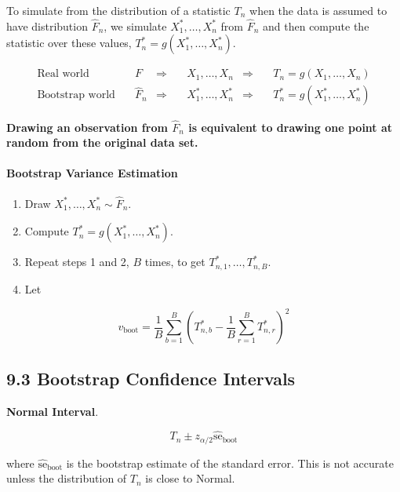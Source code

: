 To simulate from the distribution of a statistic \(T_{n}\) when the data
is assumed to have distribution \(\hat{F}_{n}\), we simulate
\(X_{1}^*, \dots, X_{n}^*\) from \(\hat{F}_{n}\) and then compute the
statistic over these values, \(T_{n}^* = g(X_{1}^*, \dots, X_{n}^*)\).

\begin{align*}
\text{Real world} \quad      & F         & \Longrightarrow\quad & X_{1}, \dots, X_{n}        & \Longrightarrow & \quad T_{n} = g(X_{1}, \dots, X_{n}) \\
\text{Bootstrap world} \quad & \hat{F}_{n} & \Longrightarrow\quad  & X_{1}^*, \dots, X_{n}^* & \Longrightarrow & \quad T_{n}^* = g(X_{1}^*, \dots, X_{n}^*)
\end{align*}

\textbf{Drawing an observation from \(\hat{F}_{n}\) is equivalent to
drawing one point at random from the original data set.}

\paragraph{Bootstrap Variance
Estimation}\label{bootstrap:variance}

\begin{enumerate}[tightlist,label={\arabic*.}]
\item
  Draw \(X_{1}^*, \dots, X_{n}^* \sim \hat{F}_{n}\).
\item
  Compute \(T_{n}^* = g(X_{1}^*, \dots, X_{n}^*)\).
\item
  Repeat steps 1 and 2, \(B\) times, to get
  \(T_{n, 1}^*, \dots, T_{n, B}^*\).
\item
  Let
\end{enumerate}

\[ v_{\text{boot}} = \frac{1}{B} \sum_{b=1}^B \left( T_{n, b}^* - \frac{1}{B} \sum_{r=1}^B T_{n, r}^* \right)^{2} \]

\subsection*{9.3 Bootstrap Confidence
Intervals}\label{bootstrap-confidence-intervals}

\textbf{Normal Interval}.

\[ T_{n} \pm z_{\alpha/2} \hat{\text{se}}_\text{boot} \]

where \(\hat{\text{se}}_\text{boot}\) is the bootstrap estimate of the
standard error. This is not accurate unless the distribution of \(T_{n}\)
is close to Normal.

